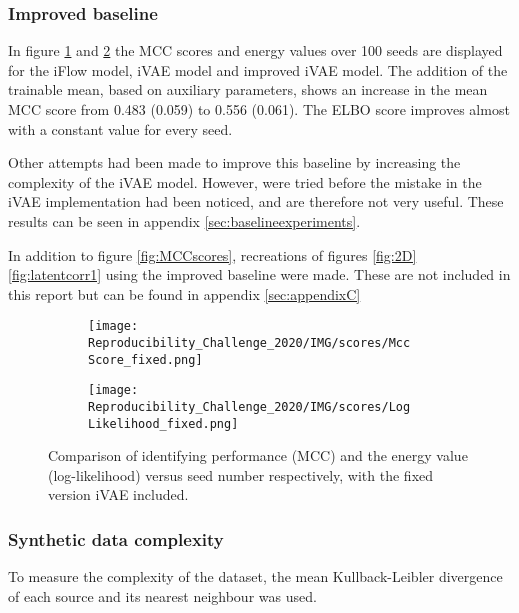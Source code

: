 \subsubsection{Improved baseline}
\label{sec:alt methods}
In figure \ref{fig:MCCscores_Fixed:a} and \ref{fig:MCCscores_Fixed:b} the MCC scores and energy values over 100 seeds are displayed for the iFlow model, iVAE model and improved iVAE model. The addition of the trainable mean, based on auxiliary parameters, shows an increase in the mean MCC score from 0.483 (0.059) to 0.556 (0.061). The ELBO score improves almost with a constant value for every seed.

Other attempts had been made to improve this baseline by increasing the complexity of the iVAE model. However, were tried before the mistake in the iVAE implementation had been noticed, and are therefore not very useful. These results can be seen in appendix \ref{sec:baselineexperiments}.

In addition to figure \ref{fig:MCCscores}, recreations of figures \ref{fig:2D} \ref{fig:latentcorr1} using the improved baseline were made. These are not included in this report but can be found in appendix \ref{sec:appendixC}

\begin{figure}[htb] 
  \begin{subfigure}[b]{0.5\linewidth}
    \centering
    \texttt{[image: Reproducibility\_Challenge\_2020/IMG/scores/Mcc Score\_fixed.png]}
    \caption{} 
    \label{fig:MCCscores_Fixed:a} 
  \end{subfigure}%
  \begin{subfigure}[b]{0.5\linewidth}
    \centering
    \texttt{[image: Reproducibility\_Challenge\_2020/IMG/scores/Log Likelihood\_fixed.png]} 
    \caption{} 
    \label{fig:MCCscores_Fixed:b} 
  \end{subfigure} 
  \caption{Comparison of identifying performance (MCC) and the energy value (log-likelihood) versus seed number respectively, with the fixed version iVAE included.}
  \label{fig:MCCscores_Fixed}
\end{figure}

\subsubsection{Synthetic data complexity}
To measure the complexity of the dataset, the mean Kullback-Leibler divergence \cite{kullback1951information} of each source and its nearest neighbour was used.

